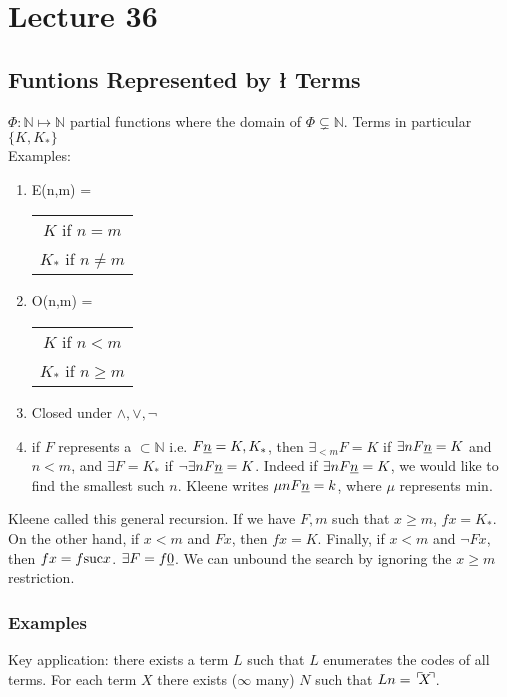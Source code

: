\chapter{Lecture 36}
\def\floor#1{\lceil #1 \rceil}

\pagestyle{fancy}

\section{Funtions Represented by \l{} Terms}
$\Phi : \mathbb{N} \mapsto \mathbb{N}$ partial functions where the domain of $\Phi \subsetneq \mathbb{N}$. Terms in particular $\{K,K_*\}$\\

Examples:
\begin{enumerate}[(1)]
  \item E(n,m) = \begin{tabular}{c}$K$ if $n = m$\\$K_*$ if $n \not= m$\end{tabular}
  \item O(n,m) = \begin{tabular}{c}$K$ if $n < m$\\$K_*$ if $n \geq m$\end{tabular}
  \item Closed under $\wedge,\vee,\neg$
  \item if $F$ represents a $\subset \mathbb{N}$ i.e. $F\uline{n} = K,K_*$, then $\exists_{<m} F = K$ if $\exists n F\uline{n} = K$ and $n < m$, and $\exists F = K_*$ if $\neg \exists n F\uline{n} = K$. Indeed if $\exists n F\uline{n} = K$, we would like to find the smallest such $n$. Kleene writes $\mu n F\uline{n} = k$, where $\mu$ represents min.
\end{enumerate}
Kleene called this general recursion. If we have $F,m$ such that $x \geq m$, $fx = K_*$. On the other hand, if $x < m$ and $Fx$, then $fx = K$. Finally, if $x < m$ and $\neg Fx$, then $fx = f \hbox{suc}x$. $\exists F = f\uline{0}$. We can unbound the search by ignoring the $x \geq m$ restriction.\\

\subsection{Examples}
Key application: there exists a term $L$ such that $L$ enumerates the codes of all terms. For each term $X$ there exists ($\infty$ many) $N$ such that $L n = \godnum{X}$.


